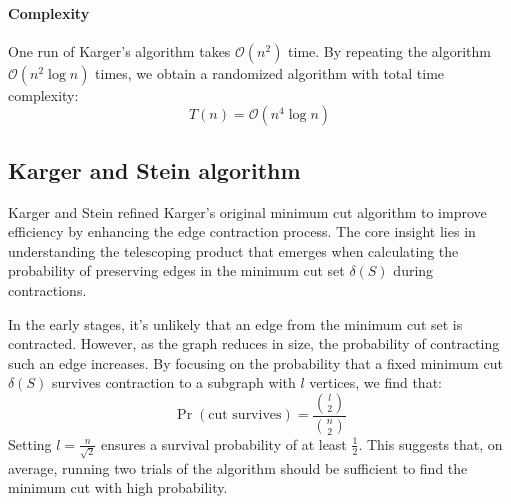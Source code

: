 \paragraph*{Complexity}
One run of Karger's algorithm takes $\mathcal{O}(n^2)$ time.
By repeating the algorithm $\mathcal{O}(n^2\log n)$ times, we obtain a randomized algorithm with total time complexity:
\[T(n)=\mathcal{O}(n^4\log n)\] 

\subsection{Karger and Stein algorithm}
Karger and Stein refined Karger's original minimum cut algorithm to improve efficiency by enhancing the edge contraction process.
The core insight lies in understanding the telescoping product that emerges when calculating the probability of preserving edges in the minimum cut set $\delta(S)$ during contractions.

In the early stages, it's unlikely that an edge from the minimum cut set is contracted. 
However, as the graph reduces in size, the probability of contracting such an edge increases. 
By focusing on the probability that a fixed minimum cut $\delta(S)$ survives contraction to a subgraph with $l$ vertices, we find that:
\[\Pr(\text{cut survives})=\frac{\binom{l}{2}}{\binom{n}{2}}\]
Setting $l=\frac{n}{\sqrt{2}}$ ensures a survival probability of at least $\frac{1}{2}$.
This suggests that, on average, running two trials of the algorithm should be sufficient to find the minimum cut with high probability.

